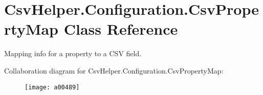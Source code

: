 \hypertarget{a00070}{\section{Csv\-Helper.\-Configuration.\-Csv\-Property\-Map Class Reference}
\label{a00070}
}


Mapping info for a property to a C\-S\-V field.  




Collaboration diagram for Csv\-Helper.\-Configuration.\-Csv\-Property\-Map\-:
\nopagebreak
\begin{figure}[H]
\begin{center}
\leavevmode
\texttt{[image: a00489]}
\end{center}
\end{figure}
